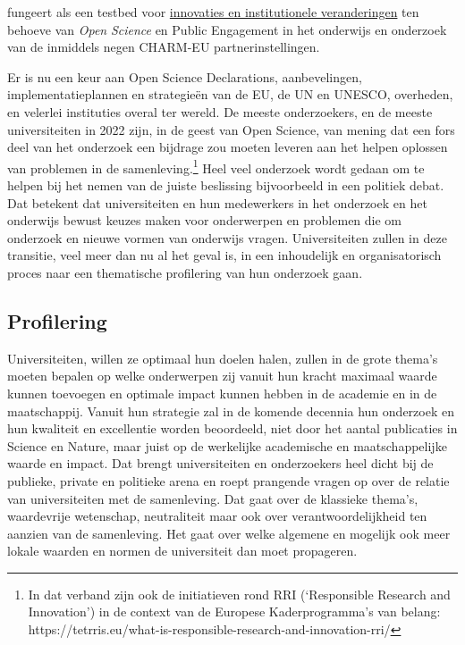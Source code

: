 \documentclass{jote-book}
\begin{document}
\begin{bookboxnotitle}
fungeert als een testbed voor \href{https://www.charm-eu.eu/torch}{innovaties en institutionele veranderingen} ten behoeve van \emph{Open }\emph{Science} en Public Engagement in het onderwijs en onderzoek van de inmiddels negen CHARM-EU partnerinstellingen.
	\end{bookboxnotitle}

	Er is nu een keur aan Open Science Declarations, aanbevelingen, implementatieplannen en strategieën van de EU, de UN en UNESCO, overheden, en velerlei instituties overal ter wereld. De meeste onderzoekers, en de meeste universiteiten in 2022 zijn, in de geest van Open Science, van mening dat een fors deel van het onderzoek een bijdrage zou moeten leveren aan het helpen oplossen van problemen in de samenleving.\footnote{In dat verband zijn ook de initiatieven rond RRI (‘Responsible Research and Innovation') in de context van de Europese Kaderprogramma's van belang: https://tetrris.eu/what-is-responsible-research-and-innovation-rri/} Heel veel onderzoek wordt gedaan om te helpen bij het nemen van de juiste beslissing bijvoorbeeld in een politiek debat. Dat betekent dat universiteiten en hun medewerkers in het onderzoek en het onderwijs bewust keuzes maken voor onderwerpen en problemen die om onderzoek en nieuwe vormen van onderwijs vragen. Universiteiten zullen in deze transitie, veel meer dan nu al het geval is, in een inhoudelijk en organisatorisch proces naar een thematische profilering van hun onderzoek gaan.



	\subsection{Profilering}



	Universiteiten, willen ze optimaal hun doelen halen, zullen in de grote thema's moeten bepalen op welke onderwerpen zij vanuit hun kracht maximaal waarde kunnen toevoegen en optimale impact kunnen hebben in de academie en in de maatschappij. Vanuit hun strategie zal in de komende decennia hun onderzoek en hun kwaliteit en excellentie worden beoordeeld, niet door het aantal publicaties in Science en Nature, maar juist op de werkelijke academische en maatschappelijke waarde en impact. Dat brengt universiteiten en onderzoekers heel dicht bij de publieke, private en politieke arena en roept prangende vragen op over de relatie van universiteiten met de samenleving. Dat gaat over de klassieke thema's, waardevrije wetenschap, neutraliteit maar ook over verantwoordelijkheid ten aanzien van de samenleving. Het gaat over welke algemene en mogelijk ook meer lokale waarden en normen de universiteit dan moet propageren.
\end{document}

